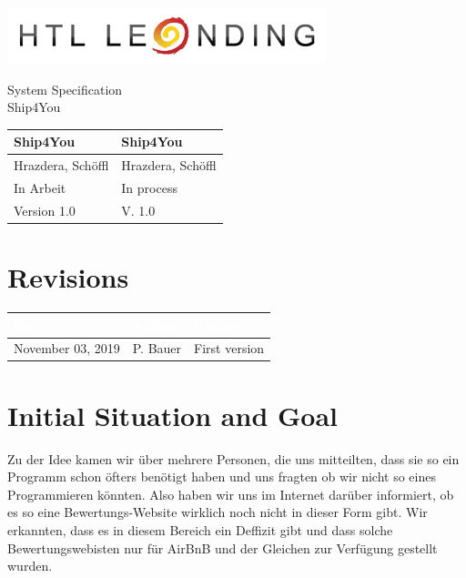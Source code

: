 \documentclass[12pt]{article}
\theoremstyle{definition}
\newcommand{\projectname}{Ship4You}
\newcommand{\productname}{Ship4You}
\newcommand{\projectleader}{Hrazdera, Schöffl}
\newcommand{\documentstatus}{In process}
\newcommand{\version}{V. 1.0}
\begin{document}
\begin{titlepage}
\begin{flushright}
\includegraphics[scale=.5]{htlleondinglogo.png}\\
\end{flushright}

\vspace{10em}

\begin{center}
{\Huge System Specification} \\[3em]
{\LARGE \productname} \\[3em]
\end{center}

\begin{flushleft}
\begin{tabular}{|l|l|}
\hline
Ship4You & \projectname \\ \hline
Hrazdera, Schöffl & \projectleader \\ \hline
In Arbeit & \documentstatus \\ \hline
Version 1.0 & \version \\ \hline
\end{tabular}
\end{flushleft}

\end{titlepage}
\section*{Revisions}
\begin{tabular}{|l|l|l|}
\hline
\cellcolor[gray]{0.5}\textcolor{white}{Date} & \cellcolor[gray]{0.5}\textcolor{white}{Author} & \cellcolor[gray]{0.5}\textcolor{white}{Change} \\ \hline
November 03, 2019&P. Bauer&First version \\ \hline
\end{tabular}
\pagebreak

\tableofcontents
\pagebreak

\section{Initial Situation and Goal}
	Zu der Idee kamen wir über mehrere Personen, die uns mitteilten, dass sie so ein Programm schon öfters benötigt haben und uns fragten ob wir nicht so eines Programmieren könnten. Also haben wir uns im Internet darüber informiert, ob es so eine Bewertungs-Website wirklich noch nicht in dieser Form gibt.
	Wir erkannten, dass es in diesem Bereich ein Deffizit gibt und dass solche Bewertungswebisten nur für AirBnB und der Gleichen zur Verfügung gestellt wurden.
	
\end{document}
